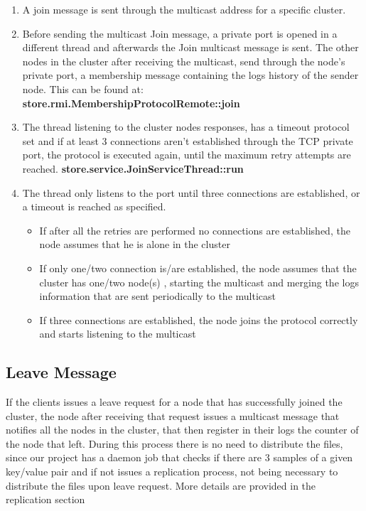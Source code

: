\begin{enumerate}
    \item A join message is sent through the multicast address for a specific cluster.
    \item Before sending the multicast Join message, a private port is opened in a different thread and afterwards the Join multicast message is sent. The other nodes in the cluster after receiving the multicast,  send through the node's private port, a membership message containing the logs history of the sender node. This can be found at:  \textbf{store.rmi.MembershipProtocolRemote::join}
    \item The thread listening to the cluster nodes responses, has a timeout protocol set and if at least 3 connections aren't established through the TCP private port, the protocol is executed again, until the maximum retry attempts are reached. \textbf{store.service.JoinServiceThread::run}
    \item The thread only listens to the port until three connections are established, or a timeout is reached as specified.
    \begin{itemize}
        \item If after all the retries are performed no connections are established, the node assumes that he is alone in the cluster
        \item If only one/two connection is/are established, the node assumes that the cluster has one/two node(s) , starting the multicast and merging the logs information that are sent periodically to the multicast
        \item If three connections are established, the node joins the protocol correctly and starts listening to the multicast
    \end{itemize}
\end{enumerate}


\subsection{Leave Message}

If the clients issues a leave request for a node that has successfully joined the cluster, the node after receiving that request issues a multicast message that notifies all the nodes in the cluster, that then register in their logs the counter of the node that left. During this process there is no need to distribute the files, since our project has a daemon job that checks if there are 3 samples of a given key/value pair and if not issues a replication process, not being necessary to distribute the files upon leave request. More details are provided in the replication section

